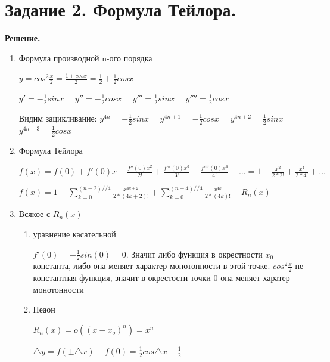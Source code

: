 
\section{Задание 2. Формула Тейлора.}

\vspace{10mm}
\textbf{Решение.}

\begin{enumerate}
    \item Формула производной n-ого порядка

    $\displaystyle y = cos^2 \frac{x}{2} = \frac{1 + cos x}{2} = \frac{1}{2} + \frac{1}{2} cos x$

    $y' = \displaystyle -\frac{1}{2} sin x\quad$ 
    $y'' = \displaystyle -\frac{1}{2} cos x\quad$
    $y''' = \displaystyle \frac{1}{2} sin x\quad$
    $y'''' = \displaystyle \frac{1}{2} cos x$

    Видим зацикливание: 
    $y^{4n} = \displaystyle -\frac{1}{2} sin x\quad$ 
    $y^{4n + 1} = \displaystyle -\frac{1}{2} cos x\quad$
    $y^{4n+2} = \displaystyle \frac{1}{2} sin x\quad$
    $y^{4n+3} = \displaystyle \frac{1}{2} cos x$

    \item Формула Тейлора

    $\displaystyle f(x) = f(0) + f'(0)x + \frac{f''(0)x^2}{2!} + \frac{f'''(0)x^3}{3!} + \frac{f''''(0)x^4}{4!} + \dots = 1 - \frac{x^2}{2 * 2!} + \frac{x^4}{2 * 4!} + \dots$

    $\displaystyle f(x) = 1 - \sum_{k=0}^{(n - 2)//4}\frac{x^{4k + 2}}{2 * (4k+2)!} + \sum_{k=0}^{(n - 4)//4}\frac{x^{4k}}{2 * (4k)!} + R_n(x)$

    \item Всякое с $R_n(x)$

    \begin{enumerate}
        \item уравнение касательной
        
        $f'(0) = - \frac{1}{2}sin(0) = 0$. Значит либо функция в окрестности $x_0$ константа, либо она меняет характер монотонности в этой точке. $cos^2 \frac{x}{2}$ не константная функция, значит в окрестости точки 0 она меняет харатер монотонности\\

        \item Пеаон

    $\displaystyle  R_n(x) = o((x-x_o)^n) = x^n$

    $\displaystyle  \triangle y = f(\pm \triangle x) - f(0) = \frac{1}{2} cos \triangle x - \frac{1}{2}$


\end{enumerate}
\end{enumerate}
